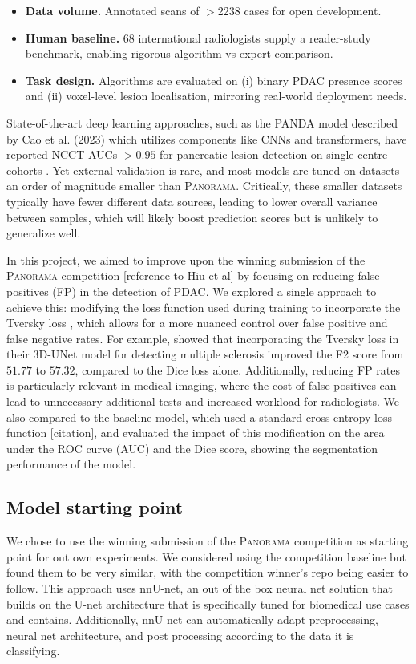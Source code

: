 \documentclass[conference]{IEEEtran}
\begin{document}
\begin{itemize}[leftmargin=*]
  \item \textbf{Data volume.} Annotated scans of $>$2238 cases for open development.
  \item \textbf{Human baseline.} 68 international radiologists supply a reader-study benchmark, enabling rigorous algorithm-vs-expert comparison.
  \item \textbf{Task design.} Algorithms are evaluated on (i) binary PDAC presence scores and (ii) voxel-level lesion localisation, mirroring real-world deployment needs.
\end{itemize}

State-of-the-art deep learning approaches, such as the PANDA model described by Cao et al. (2023) which utilizes components like CNNs and transformers, have reported NCCT AUCs $>0.95$ for pancreatic lesion detection on single-centre cohorts \cite{b9}. Yet external validation is rare, and most models are tuned on datasets an order of magnitude smaller than \textsc{Panorama}. Critically, these smaller datasets typically have fewer different data sources, leading to lower overall variance between samples, which will likely boost prediction scores but is unlikely to generalize well.

In this project, we aimed to improve upon the winning submission of the \textsc{Panorama} competition [reference to Hiu et al] by focusing on reducing false positives (FP) in the detection of PDAC. We explored a single approach to achieve this: modifying the loss function used during training to incorporate the Tversky loss \cite{b10}, which allows for a more nuanced control over false positive and false negative rates. For example, \cite{Salehi 2017 DOI: 10.1007/978-3-319-67389-9_44} showed that incorporating the Tversky loss in their 3D-UNet model for detecting multiple sclerosis improved the F2 score from $51.77$ to $57.32$, compared to the Dice loss alone. Additionally, reducing FP rates is particularly relevant in medical imaging, where the cost of false positives can lead to unnecessary additional tests and increased workload for radiologists. We also compared to the baseline model, which used a standard cross-entropy loss function [citation], and evaluated the impact of this modification on the area under the ROC curve (AUC) and the Dice score, showing the segmentation performance of the model.

\subsection{Model starting point}
We chose to use the winning submission of the \textsc{Panorama} competition as starting point for out own experiments. We considered using the competition baseline but found them to be very similar, with the competition winner's repo being easier to follow. This approach uses nnU-net, \cite{b1} an out of the box neural net solution that builds on the U-net architecture that is specifically tuned for biomedical use cases and contains. Additionally, nnU-net can automatically adapt preprocessing, neural net architecture, and post processing according to the data it is classifying.
\end{document}
